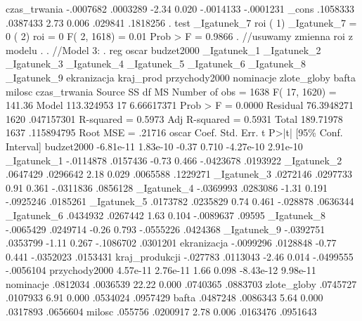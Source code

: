 \begin{stlog}
  czas_trwania {\VBAR}  -.0007682   .0003289    -2.34   0.020    -.0014133   -.0001231
         _cons {\VBAR}   .1058333   .0387433     2.73   0.006      .029841    .1818256
{\smallskip}
. test _Igatunek_7 roi
{\smallskip}
 ( 1)  _Igatunek_7 = 0
 ( 2)  roi = 0
{\smallskip}
       F(  2,  1618) =    0.01
            Prob > F =    0.9866
{\smallskip}
. //usuwamy zmienna roi z modelu
. 
. //Model 3:
. reg oscar  budzet2000 _Igatunek_1 _Igatunek_2 _Igatunek_3 _Igatunek_4 _Igatunek_5 _Igatunek_6 _Igatunek_8
 _Igatunek_9 ekranizacja kraj_prod przychody2000 nominacje zlote_globy bafta milosc czas_trwania
{\smallskip}
      Source {\VBAR}       SS       df       MS              Number of obs =    1638
           F( 17,  1620) =  141.36
       Model {\VBAR}  113.324953    17  6.66617371           Prob > F      =  0.0000
    Residual {\VBAR}  76.3948271  1620  .047157301           R-squared     =  0.5973
           Adj R-squared =  0.5931
       Total {\VBAR}   189.71978  1637  .115894795           Root MSE      =  .21716
{\smallskip}
         oscar {\VBAR}      Coef.   Std. Err.      t    P>|t|     [95\% Conf. Interval]
    budzet2000 {\VBAR}  -6.81e-11   1.83e-10    -0.37   0.710    -4.27e-10    2.91e-10
   _Igatunek_1 {\VBAR}  -.0114878   .0157436    -0.73   0.466    -.0423678    .0193922
   _Igatunek_2 {\VBAR}   .0647429   .0296642     2.18   0.029     .0065588    .1229271
   _Igatunek_3 {\VBAR}   .0272146   .0297733     0.91   0.361    -.0311836    .0856128
   _Igatunek_4 {\VBAR}  -.0369993   .0283086    -1.31   0.191    -.0925246    .0185261
   _Igatunek_5 {\VBAR}   .0173782   .0235829     0.74   0.461     -.028878    .0636344
   _Igatunek_6 {\VBAR}   .0434932   .0267442     1.63   0.104    -.0089637      .09595
   _Igatunek_8 {\VBAR}  -.0065429   .0249714    -0.26   0.793    -.0555226    .0424368
   _Igatunek_9 {\VBAR}  -.0392751   .0353799    -1.11   0.267    -.1086702    .0301201
   ekranizacja {\VBAR}  -.0099296   .0128848    -0.77   0.441    -.0352023    .0153431
kraj_produkcji {\VBAR}   -.027783   .0113043    -2.46   0.014    -.0499555   -.0056104
 przychody2000 {\VBAR}   4.57e-11   2.76e-11     1.66   0.098    -8.43e-12    9.98e-11
     nominacje {\VBAR}   .0812034   .0036539    22.22   0.000     .0740365    .0883703
   zlote_globy {\VBAR}   .0745727   .0107933     6.91   0.000     .0534024    .0957429
         bafta {\VBAR}   .0487248   .0086343     5.64   0.000     .0317893    .0656604
        milosc {\VBAR}    .055756   .0200917     2.78   0.006     .0163476    .0951643

\end{stlog}
